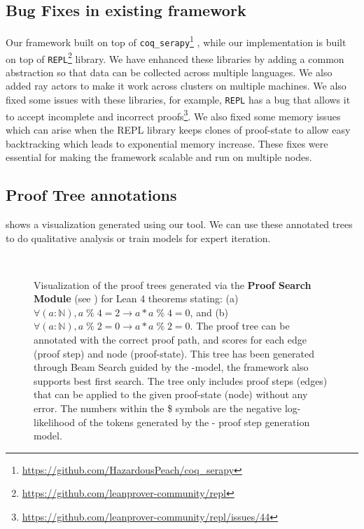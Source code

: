 \subsection{Bug Fixes in existing framework}
\label{app:bug-fixes}
Our framework built on top of \texttt{coq\_serapy}\footnote{\href{https://github.com/HazardousPeach/coq\_serapy}{https://github.com/HazardousPeach/coq\_serapy}} \citep{sanchez2020generating}, while our \lean{} implementation is built on top of \texttt{REPL}\footnote{\href{https://github.com/leanprover-community/repl}{https://github.com/leanprover-community/repl}} library. We have enhanced these libraries by adding a common abstraction so that data can be collected across multiple languages. We also added ray actors \citep{moritz2018ray} to make it work across clusters on multiple machines. We also fixed some issues with these libraries, for example, \texttt{REPL} has a bug that allows it to accept incomplete and incorrect proofs\footnote{\href{https://github.com/leanprover-community/repl/issues/44}{https://github.com/leanprover-community/repl/issues/44}}.
We also fixed some memory issues which can arise when the REPL library keeps clones of proof-state to allow easy backtracking which leads to exponential memory increase. These fixes were essential for making the framework scalable and run on multiple nodes.

\subsection{Proof Tree annotations}
\label{app:proof-trees}

 shows a visualization generated using our tool. We can use these annotated trees to do qualitative analysis or train models for expert iteration.

\begin{figure*}[h]
\centering
\footnotesize
{}\\
\caption{Visualization of the proof trees generated via the \textbf{Proof Search Module} (see ) for Lean 4 theorems stating: (a) \texttt{$\forall (a : \mathbb{N}), a\;\%\;4 = 2 \rightarrow a * a\; \%\;4 = 0$}, and (b) \texttt{$\forall (a : \mathbb{N}), a\;\%\;2 = 0 \rightarrow a * a\; \%\;2 = 0$}. The proof tree can be annotated with the correct proof path, and scores for each edge (proof step) and node (proof-state). This tree has been generated through Beam Search guided by the \proofwala-\multi\;model, the framework also supports best first search. The tree only includes proof steps (edges) that can be applied to the given proof-state (node) without any error. The numbers within the \$ symbols are the negative log-likelihood of the tokens generated by the \proofwala-\multi\; proof step generation model.}
\label{fig:proof-search-annotation}
\end{figure*}


